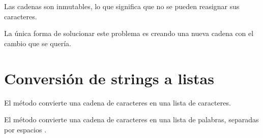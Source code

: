Las cadenas son inmutables, lo que significa que no se pueden reasignar sus caracteres.


La única forma de solucionar este problema es creando una nueva cadena con el cambio que se quería.


\section{Conversión de strings a listas}

El método  convierte una cadena de caracteres en una lista de caracteres.


El método  convierte una cadena de caracteres en una lista de palabras, separadas por espacios \ttt{\qq  \qq}.


\clearpage